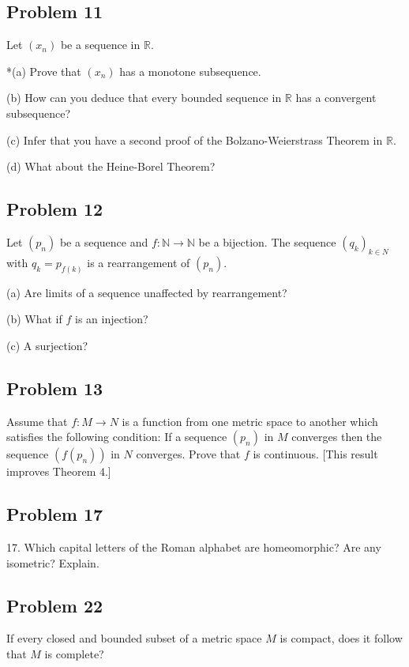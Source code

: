 \documentclass{amsart}
\begin{document}
\bigskip

\subsection*{Problem 11} Let $(x_n)$ be a sequence in $\mathbb{R}$.

*(a) Prove that $(x_n)$ has a monotone subsequence.

(b) How can you deduce that every bounded sequence in $\mathbb{R}$ has a convergent subsequence?

(c) Infer that you have a second proof of the Bolzano-Weierstrass Theorem in $\mathbb{R}$.

(d) What about the Heine-Borel Theorem?

\noindent

\bigskip

\subsection*{Problem 12} Let $(p_n)$ be a sequence and $f : \mathbb{N} \rightarrow \mathbb{N}$ 
be a bijection. The sequence $(q_k)_{k\in N}$
with $q_k = p_{f(k)}$ is a rearrangement of $(p_n)$.

(a) Are limits of a sequence unaffected by rearrangement? 

(b) What if $f$ is an injection?

(c) A surjection?

\noindent

\bigskip

\subsection*{Problem 13} Assume that $f : M \rightarrow N$ is a function from one metric space to another 
which satisfies the following condition: If a sequence $(p_n)$ in $M$ converges then the sequence 
$(f(p_n))$ in $N$ converges. Prove that $f$ is continuous. [This result improves Theorem 4.]

\noindent

\bigskip

\subsection*{Problem 17} 17. Which capital letters of the Roman alphabet are homeomorphic? Are any
isometric? Explain.


\bigskip

\subsection*{Problem 22} If every closed and bounded subset of a metric space $M$ is compact, does it 
follow that $M$ is complete?
\end{document}

